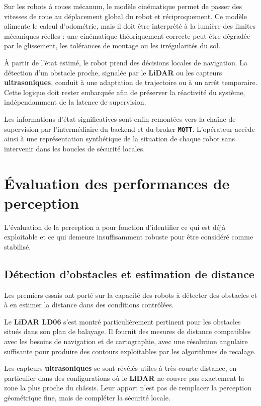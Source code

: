 \documentclass[11pt,a4paper]{report}
\newcommand{\kw}[1]{\textbf{#1}}
\newcommand{\outil}[1]{\textbf{\texttt{#1}}}
\begin{document}
Sur les robots à roues mécanum, le modèle cinématique permet de passer des vitesses de roue au déplacement global du robot et réciproquement. Ce modèle alimente le calcul d’odométrie, mais il doit être interprété à la lumière des limites mécaniques réelles : une cinématique théoriquement correcte peut être dégradée par le glissement, les tolérances de montage ou les irrégularités du sol.

À partir de l’état estimé, le robot prend des décisions locales de navigation. La détection d’un obstacle proche, signalée par le \kw{LiDAR} ou les capteurs \kw{ultrasoniques}, conduit à une adaptation de trajectoire ou à un arrêt temporaire. Cette logique doit rester embarquée afin de préserver la réactivité du système, indépendamment de la latence de supervision.

Les informations d’état significatives sont enfin remontées vers la chaîne de supervision par l’intermédiaire du backend et du broker \outil{MQTT}. L’opérateur accède ainsi à une représentation synthétique de la situation de chaque robot sans intervenir dans les boucles de sécurité locales.

\section{Évaluation des performances de perception}

L’évaluation de la perception a pour fonction d’identifier ce qui est déjà exploitable et ce qui demeure insuffisamment robuste pour être considéré comme stabilisé.

\subsection{Détection d’obstacles et estimation de distance}

Les premiers essais ont porté sur la capacité des robots à détecter des obstacles et à en estimer la distance dans des conditions contrôlées.

Le \kw{LiDAR LD06} s’est montré particulièrement pertinent pour les obstacles situés dans son plan de balayage. Il fournit des mesures de distance compatibles avec les besoins de navigation et de cartographie, avec une résolution angulaire suffisante pour produire des contours exploitables par les algorithmes de recalage.

Les capteurs \kw{ultrasoniques} se sont révélés utiles à très courte distance, en particulier dans des configurations où le \kw{LiDAR} ne couvre pas exactement la zone la plus proche du châssis. Leur apport n’est pas de remplacer la perception géométrique fine, mais de compléter la sécurité locale.
\end{document}
